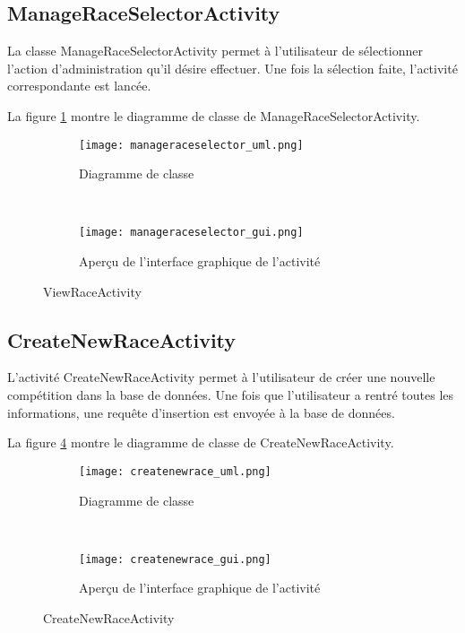 \subsection{ManageRaceSelectorActivity}

La classe ManageRaceSelectorActivity permet à l'utilisateur de sélectionner l'action d'administration qu'il désire effectuer. Une fois la sélection  faite, l'activité correspondante est lancée.

La figure \ref{fig:manageraceselector_uml} montre le diagramme de classe de ManageRaceSelectorActivity.

\begin{figure}[htb!]
    \centering
    \begin{subfigure}[htb]{0.49\textwidth}
		\texttt{[image: manageraceselector\_uml.png]} 
		\caption{Diagramme de classe}
		\label{fig:manageraceselector_uml}
    \end{subfigure}
    ~ %
    \begin{subfigure}[htb]{0.49\textwidth}
		\texttt{[image: manageraceselector\_gui.png]} 
		\caption{Aperçu de l'interface graphique de l'activité}
		\label{fig:manageraceselector_gui}
    \end{subfigure}
    \caption{ViewRaceActivity}\label{fig:manageraceselector_fig}
\end{figure}

\subsection{CreateNewRaceActivity}

L'activité CreateNewRaceActivity permet à l'utilisateur de créer une nouvelle compétition dans la base de données. Une fois que l'utilisateur a rentré toutes les informations, une requête d'insertion est envoyée à la base de données.

La figure \ref{fig:createnewrace_uml} montre le diagramme de classe de CreateNewRaceActivity.

\begin{figure}[htb!]
    \centering
    \begin{subfigure}[htb]{0.49\textwidth}
		\texttt{[image: createnewrace\_uml.png]} 
		\caption{Diagramme de classe}
		\label{fig:createnewrace_uml}
    \end{subfigure}
    ~ %
    \begin{subfigure}[htb]{0.49\textwidth}
		\texttt{[image: createnewrace\_gui.png]} 
		\caption{Aperçu de l'interface graphique de l'activité}
		\label{fig:createnewrace_gui}
    \end{subfigure}
    \caption{CreateNewRaceActivity}\label{fig:createnewrace_fig}
\end{figure}


